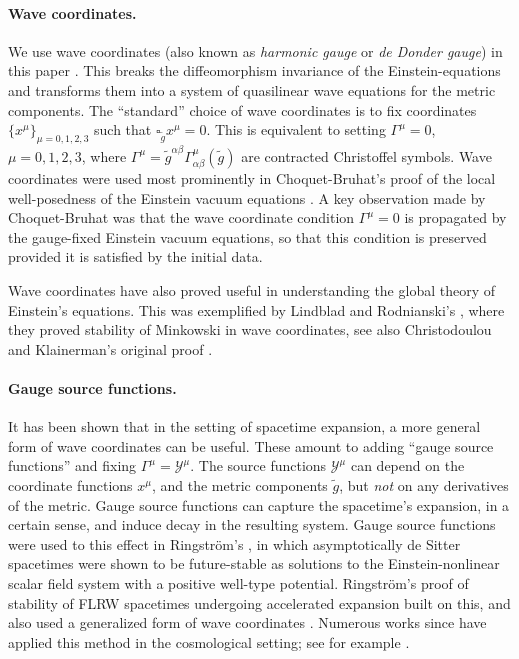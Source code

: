 \documentclass{article}
\newcommand{\mc}{\mathcal}
\newcommand{\wt}{\widetilde}
\begin{document}
\paragraph{Wave coordinates.}
We use wave coordinates (also known as  \emph{harmonic gauge} or \emph{de Donder gauge}) in this paper \cite{Cho:Einsteinlwp:52}. This breaks the diffeomorphism invariance of the Einstein-equations and transforms them into a system of quasilinear wave equations for the metric components. The ``standard'' choice of wave coordinates is to fix coordinates $\{x^\mu\}_{\mu=0,1,2,3}$ such that $\square_{\wt{g}} x^\mu = 0$. This is equivalent to setting $\Gamma^\mu= 0$, $\mu = 0,1,2,3$, where $\Gamma^\mu = \wt{g}^{\alpha\beta}\Gamma_{\alpha\beta}^\mu(\wt{g})$ are contracted Christoffel symbols. Wave coordinates were used most prominently in Choquet-Bruhat's proof of the local well-posedness of the Einstein vacuum equations \cite{Cho:Einsteinlwp:52}. A key observation made by Choquet-Bruhat was that the wave coordinate condition $\Gamma^\mu = 0$ is propagated by the gauge-fixed Einstein vacuum equations, so that this condition is preserved provided it is satisfied by the initial data.

Wave coordinates have also proved useful in understanding the global theory of Einstein's equations. This was exemplified by Lindblad and Rodnianski's \cite{LinRod:Minkowskiwavestab10}, where they proved stability of Minkowski in wave coordinates, see also Christodoulou and Klainerman's original proof \cite{ChrKlai:minkowskistab:93}.

\paragraph{Gauge source functions.}
It has been shown that in the setting of spacetime expansion, a more general form of wave coordinates can be useful. These amount to adding ``gauge source functions'' and fixing $\Gamma^\mu = \mc{Y}^\mu$. The source functions $\mc{Y}^\mu$ can depend on the coordinate functions $x^\mu$, and the metric components $\wt{g}$, but \emph{not} on any derivatives of the metric. Gauge source functions can capture the spacetime's expansion, in a certain sense, and induce decay in the resulting system. Gauge source functions were used to this effect in Ringstr\"om's \cite{Rin:deSitterENSFstab08}, in which asymptotically de Sitter spacetimes were shown to be future-stable as solutions to the Einstein-nonlinear scalar field system with a positive well-type potential. Ringstr\"om's proof of stability of FLRW spacetimes undergoing accelerated expansion built on this, and also used a generalized form of wave coordinates \cite{Rin:powerlaw:09}. Numerous works since have applied this method in the cosmological setting; see for example \cite{RodSpe:irrEulerdeSitterstab:13,Spe:EulerdeSitterstab:12,HadSpe:deSitterduststab:15,Oli:EulerdeSitterstab:16,HinVas:KdSexpandingstab:24}.
\end{document}
